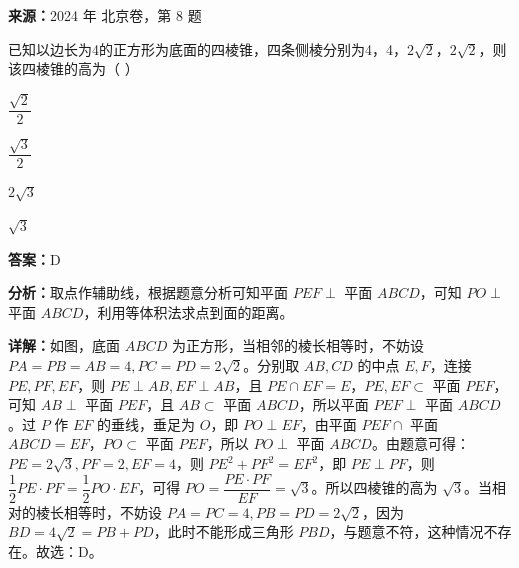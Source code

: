 \begin{question}[points=4]
\textbf{来源：}2024 年 北京卷，第 8 题\par
已知以边长为4的正方形为底面的四棱锥，四条侧棱分别为4，4，$2\sqrt{2}$，$2\sqrt{2}$，则该四棱锥的高为（ ）
\begin{choices}
  \item $\dfrac{\sqrt{2}}{2}$
  \item $\dfrac{\sqrt{3}}{2}$
  \item $2\sqrt{3}$
  \item $\sqrt{3}$
\end{choices}
\begin{solution}
\textbf{答案：}D

\textbf{分析：}取点作辅助线，根据题意分析可知平面 $PEF \perp$ 平面 $ABCD$，可知 $PO \perp$ 平面 $ABCD$，利用等体积法求点到面的距离。

\textbf{详解：}如图，底面 $ABCD$ 为正方形，当相邻的棱长相等时，不妨设 $PA=PB=AB=4, PC=PD=2\sqrt{2}$。分别取 $AB, CD$ 的中点 $E,F$，连接 $PE, PF, EF$，则 $PE \perp AB, EF \perp AB$，且 $PE \cap EF = E$，$PE, EF \subset$ 平面 $PEF$，可知 $AB \perp$ 平面 $PEF$，且 $AB \subset$ 平面 $ABCD$，所以平面 $PEF \perp$ 平面 $ABCD$。过 $P$ 作 $EF$ 的垂线，垂足为 $O$，即 $PO \perp EF$，由平面 $PEF \cap$ 平面 $ABCD = EF$，$PO \subset$ 平面 $PEF$，所以 $PO \perp$ 平面 $ABCD$。由题意可得：$PE=2\sqrt{3}, PF=2, EF=4$，则 $PE^2+PF^2=EF^2$，即 $PE \perp PF$，则 $\dfrac{1}{2} PE \cdot PF = \dfrac{1}{2} PO \cdot EF$，可得 $PO = \dfrac{PE \cdot PF}{EF} = \sqrt{3}$。所以四棱锥的高为 $\sqrt{3}$。当相对的棱长相等时，不妨设 $PA=PC=4, PB=PD=2\sqrt{2}$，因为 $BD=4\sqrt{2}=PB+PD$，此时不能形成三角形 $PBD$，与题意不符，这种情况不存在。故选：D。
\end{solution}
\end{question}


